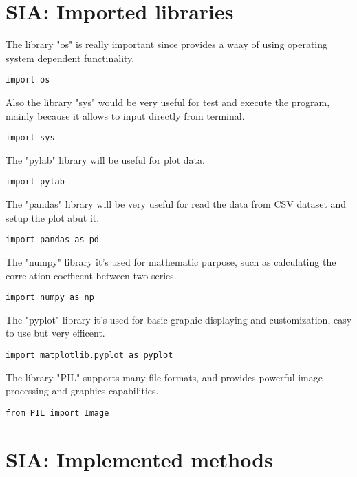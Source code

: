 


\label{SIA_Implementation}

\section{SIA: Imported libraries}
\label{SIA_libraries}
The library "os" is really important since provides a waay of using operating system dependent functinality.
\begin{lstlisting}
import os
\end{lstlisting}

Also the library "sys" would be very useful for test and execute the program, mainly because it allows to input directly from terminal.
\begin{lstlisting}
import sys
\end{lstlisting}

The "pylab" library will be useful for plot data.
\begin{lstlisting}
import pylab
\end{lstlisting}

The "pandas" library will be very useful for read the data from CSV dataset and setup the plot abut it.
\begin{lstlisting}
import pandas as pd
\end{lstlisting}

The "numpy" library it's used for mathematic purpose, such as calculating the correlation coefficent between two series.
\begin{lstlisting}
import numpy as np
\end{lstlisting}
 
The "pyplot" library it's used for basic graphic displaying and customization, easy to use but very efficent.
\begin{lstlisting}
import matplotlib.pyplot as pyplot
\end{lstlisting}

The library "PIL" supports many file formats, and provides powerful image processing and graphics capabilities.
\begin{lstlisting}
from PIL import Image
\end{lstlisting}

\section{SIA: Implemented methods}

